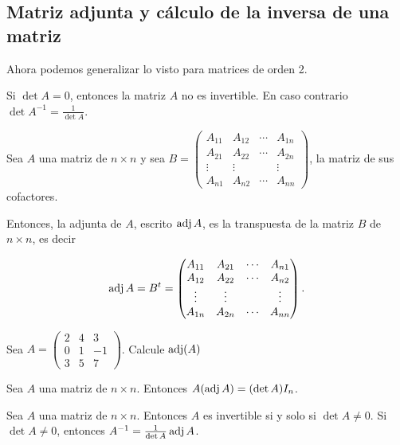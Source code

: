 \subsection{Matriz adjunta y c\'alculo de la inversa de una matriz}
Ahora podemos generalizar lo visto para matrices de orden 2.
\begin{thm}
Si $\det A = 0$, entonces la matriz $A$ no es invertible. En caso contrario $\det A^{-1} = \frac{1}{\det A}$.
\end{thm}


\begin{defin}
Sea $A$ una matriz de $n \times n$ y sea 
$B =  \begin{pmatrix} A_{11} & A_{12} & \cdots & A_{1n} \\ A_{21} & A_{22} & \cdots & A_{2n} \\ \vdots & \vdots & & \vdots \\  A_{n1} & A_{n2} & \cdots & A_{nn} \end{pmatrix}$, la matriz de sus cofactores. 

Entonces, la adjunta de $A$, escrito $\operatorname{adj} A$, es la transpuesta de la matriz $B$ de $n \times n$, es decir 

\[\operatorname{adj} A = B^t = \begin{pmatrix} A_{11} & A_{21} & \cdots & A_{n1} \\ A_{12} & A_{22} & \cdots & A_{n2} \\ \vdots & \vdots & & \vdots \\  A_{1n} & A_{2n} & \cdots & A_{nn} \end{pmatrix}.\]
\end{defin}





\begin{ejem}
Sea $A =  \begin{pmatrix} 2 & 4 & 3 \\ 0 & 1 & -1 \\ 3 & 5 & 7 \end{pmatrix}$. Calcule $\operatorname{adj}(A)$
\end{ejem}




\begin{thm}
Sea $A$ una matriz de $n \times n$. Entonces $A(\operatorname{adj} A) = (\det A)I_n$.
\end{thm}

\begin{thm}
Sea $A$ una matriz de $n \times n$. Entonces $A$ es invertible si y solo si $\det A \not= 0$. Si $\det A \not= 0$, entonces $A^{-1} = \frac{1}{\det A}\operatorname{adj} A$.
\end{thm}





